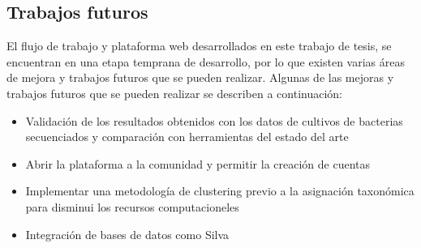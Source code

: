 \subsection{Trabajos futuros}
El flujo de trabajo y plataforma web desarrollados en este trabajo de tesis, se encuentran en una etapa temprana de desarrollo, por lo que existen varias áreas de mejora y trabajos futuros que se pueden realizar. 
Algunas de las mejoras y trabajos futuros que se pueden realizar se describen a continuación:
\begin{itemize}
    \item Validación de los resultados obtenidos con los datos de cultivos de bacterias secuenciados y comparación con herramientas del estado del arte
    \item Abrir la plataforma a la comunidad y permitir la creación de cuentas
    \item Implementar una metodología de clustering previo a la asignación taxonómica para disminui los recursos computacioneles
    \item Integración de bases de datos como Silva
\end{itemize}
